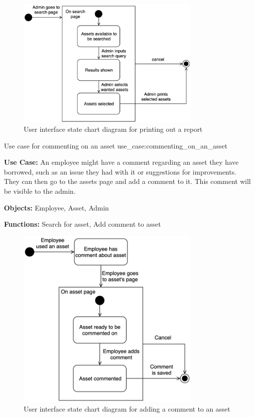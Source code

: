\begin{figure}[H]
    \centering
    \includegraphics[width=0.8\textwidth]{figures/UC_Print_report.png}
    \caption{User interface state chart diagram for printing out a report}
    \label{fig:print_report_statechart}
\end{figure}

\newpage

    {Use case for commenting on an asset}
    {use_case:commenting_on_an_asset}
    {
        \textbf{Use Case:} An employee might have a comment regarding an asset they have borrowed, such as an issue they had with it or suggestions for improvements. They can then go to the assets page and add a comment to it. This comment will be visible to the admin. 
    
        \vskip 0.2cm
        
        \textbf{Objects:} Employee, Asset, Admin
        
        \vskip 0.2cm
        
        \textbf{Functions:} Search for asset, Add comment to asset
    }

\begin{figure}[H]
    \centering
    \includegraphics[width=0.8\textwidth]{figures/UC_Add_comment.png}
    \caption{User interface state chart diagram for adding a comment to an asset}
    \label{fig:add_comment_statechart}
\end{figure}

